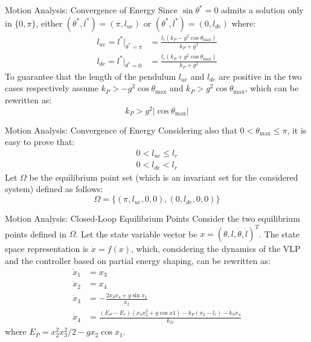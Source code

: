 \documentclass[10pt]{beamer}
\begin{document}
  \begin{frame}{Motion Analysis: Convergence of Energy}
    Since $\sin\theta^*=0$ admits a solution only in
    $\{0, \pi\}$, either $(\theta^*, l^*)=(\pi, l_{ue})$ or $(\theta^*,
    l^*)=(0, l_{de})$ where:
    \begin{align*}
      l_{ue} = l^*\rvert_{\theta^*=\pi} &=
        \frac{l_r(k_P-g^2\cos\theta_{\max})}{k_P+g^2} \\
        l_{de} = l^*\rvert_{\theta^*=0} &=
        \frac{l_r(k_P+g^2\cos\theta_{\max})}{k_P+g^2}
    \end{align*}
    To guarantee that the length
    of the pendulum $l_{ue}$ and $l_{de}$ are positive in the two
    cases respectively assume $k_P>-g^2\cos\theta_{\max}$ and
    $k_P>g^2\cos\theta_{\max}$, which can be rewritten as:
    \begin{equation*}
      k_P > g^2 |\cos\theta_{\max}|
    \end{equation*}
  \end{frame}

  \begin{frame}{Motion Analysis: Convergence of Energy}
    Considering also that $0 < \theta_{\max} \le \pi$,
    it is easy to prove that:
    \begin{gather*}
        0 < l_{ue} \le l_r \\ 0 < l_{de} < l_r
    \end{gather*}
    Let $\Omega$ be the equilibrium point set (which is an
    invariant set for the considered system) defined as follows:
    \begin{equation*}
      \Omega = \{ (\pi, l_{ue}, 0, 0), (0, l_{de}, 0, 0) \}
    \end{equation*}
  \end{frame}

  \begin{frame}{Motion Analysis: Closed-Loop Equilibrium Points}
    Consider the two equilibrium points defined in $\Omega$.
    Let the state variable vector be $x = (\theta, l, \dot{\theta},
    \dot{l})^T$. The state space representation is $\dot{x} = f(x)$,
    which, considering the dynamics of the VLP and the controller based on
    partial energy shaping, can be rewritten as: 
    \begin{align*}
      \dot{x}_1 &= x_3 \\
      \dot{x}_2 &= x_4 \\
      \dot{x}_3 &= -\frac{2 x_3 x_4 + g\sin x_1}{x_2} \\
      \dot{x}_4 &= \frac{(E_P-E_r)(x_2 x_3^2 + g\cos x1)
        -k_P(x_2-l_r)-k_V x_4}{k_D}
    \end{align*}
    where $E_P=x_2^2 x_3^2 / 2 - g x_2 \cos x_1$.
  \end{frame}
\end{document}
